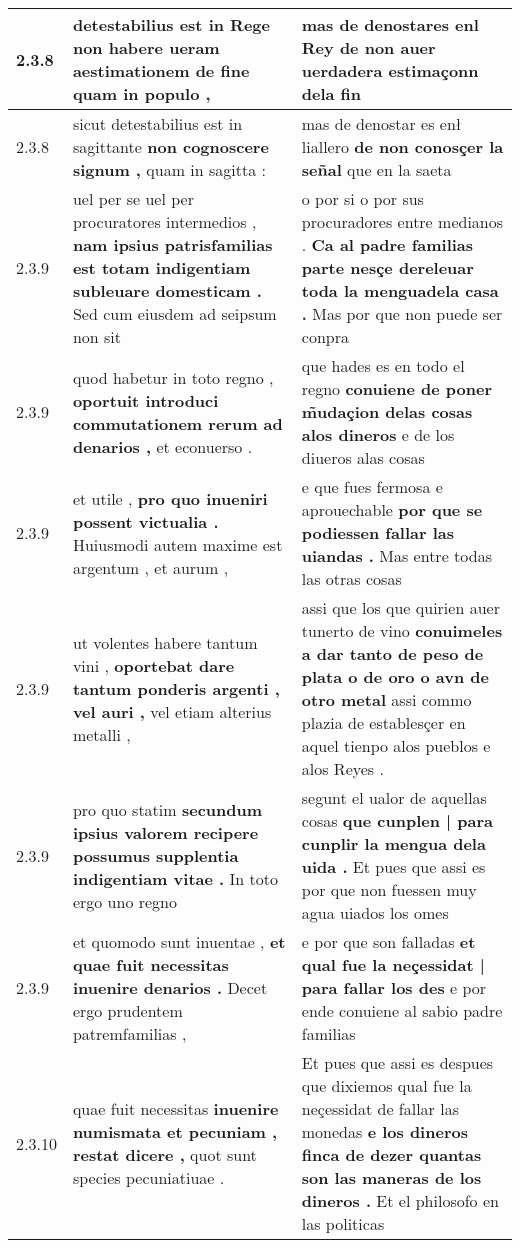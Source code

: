 \begin{tabular}{|p{1cm}|p{6.5cm}|p{6.5cm}|}
2.3.8 & detestabilius est in Rege \textbf{ non habere ueram aestimationem } de fine quam in populo , & mas de denostares enl Rey \textbf{ de non auer uerdadera } estimaçonn dela fin \\\hline
2.3.8 & sicut detestabilius est in sagittante \textbf{ non cognoscere signum , } quam in sagitta : & mas de denostar es enł liallero \textbf{ de non conosçer la señal } que en la saeta \\\hline
2.3.9 & uel per se uel per procuratores intermedios , \textbf{ nam ipsius patrisfamilias est totam indigentiam subleuare domesticam . } Sed cum eiusdem ad seipsum non sit & o por si o por sus procuradores entre medianos . \textbf{ Ca al padre familias parte nesçe dereleuar toda la menguadela casa . } Mas por que non puede ser conpra \\\hline
2.3.9 & quod habetur in toto regno , \textbf{ oportuit introduci commutationem rerum ad denarios , } et econuerso . & que hades es en todo el regno \textbf{ conuiene de poner m̃udaçion delas cosas alos dineros } e de los diueros alas cosas \\\hline
2.3.9 & et utile , \textbf{ pro quo inueniri possent victualia . } Huiusmodi autem maxime est argentum , et aurum , & e que fues fermosa e aprouechable \textbf{ por que se podiessen fallar las uiandas . } Mas entre todas las otras cosas \\\hline
2.3.9 & ut volentes habere tantum vini , \textbf{ oportebat dare tantum ponderis argenti , vel auri , } vel etiam alterius metalli , & assi que los que quirien auer tunerto de vino \textbf{ conuimeles a dar tanto de peso de plata o de oro o avn de otro metal } assi commo plazia de establesçer en aquel tienpo alos pueblos e alos Reyes . \\\hline
2.3.9 & pro quo statim \textbf{ secundum ipsius valorem recipere possumus supplentia indigentiam vitae . } In toto ergo uno regno & segunt el ualor de aquellas cosas \textbf{ que cunplen | para cunplir la mengua dela uida . } Et pues que assi es por que non fuessen muy agua uiados los omes \\\hline
2.3.9 & et quomodo sunt inuentae , \textbf{ et quae fuit necessitas inuenire denarios . } Decet ergo prudentem patremfamilias , & e por que son falladas \textbf{ et qual fue la neçessidat | para fallar los des } e por ende conuiene al sabio padre familias \\\hline
2.3.10 & quae fuit necessitas \textbf{ inuenire numismata et pecuniam , restat dicere , } quot sunt species pecuniatiuae . & Et pues que assi es despues que dixiemos qual fue la neçessidat de fallar las monedas \textbf{ e los dineros finca de dezer quantas son las maneras de los dineros . } Et el philosofo en las politicas \\\hline

\end{tabular}

